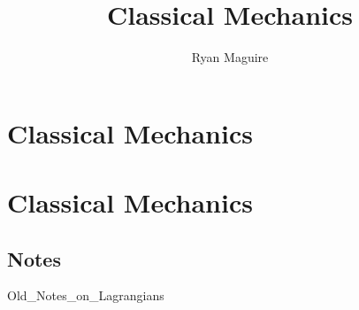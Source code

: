 \documentclass[crop=false,class=book,oneside]{standalone}
\begin{document}
    \ifx\ifphysicscourses\undefined
        \newif\ifsub
        \title{Classical Mechanics}
        \author{Ryan Maguire}
        \date{\vspace{-5ex}}
        \maketitle
        \tableofcontents
        \chapter*{Classical Mechanics}
        \setcounter{chapter}{1}
    \else
        \chapter{Classical Mechanics}
    \fi
    \section{Notes}
        {Old_Notes_on_Lagrangians}
\end{document}
